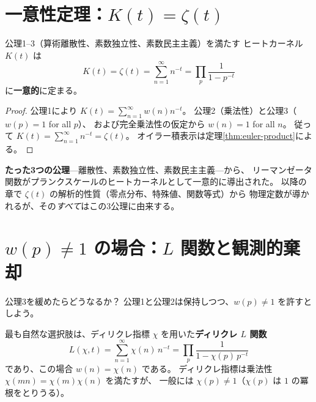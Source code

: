 \section{一意性定理：$K(t) = \zeta(t)$}
\label{sec:uniqueness}

\begin{theorem}[ヒートカーネルの一意性]
\label{thm:uniqueness}
公理1--3（算術離散性、素数独立性、素数民主主義）を満たす
ヒートカーネル $K(t)$ は
\begin{equation}
  K(t) = \zeta(t) = \sum_{n=1}^{\infty} n^{-t} = \prod_{p} \frac{1}{1 - p^{-t}}
  \label{eq:K-equals-zeta}
\end{equation}
に\textbf{一意的}に定まる。
\end{theorem}

\begin{proof}
公理1により $K(t) = \sum_{n=1}^{\infty} w(n) n^{-t}$。
公理2（乗法性）と公理3（$w(p) = 1$ for all $p$）、
および完全乗法性の仮定から $w(n) = 1$ for all $n$。
従って $K(t) = \sum_{n=1}^{\infty} n^{-t} = \zeta(t)$。
オイラー積表示は定理\ref{thm:euler-product}による。
\end{proof}

\begin{keyresult}
\textbf{たった3つの公理}---離散性、素数独立性、素数民主主義---から、
リーマンゼータ関数がプランクスケールのヒートカーネルとして一意的に導出された。
以降の章で $\zeta(t)$ の解析的性質（零点分布、特殊値、関数等式）から
物理定数が導かれるが、その\emph{すべて}はこの3公理に由来する。
\end{keyresult}


\section{$w(p) \ne 1$ の場合：$L$ 関数と観測的棄却}
\label{sec:L-functions}

公理3を緩めたらどうなるか？
公理1と公理2は保持しつつ、$w(p) \ne 1$ を許すとしよう。

最も自然な選択肢は、ディリクレ指標 $\chi$ を用いた\textbf{ディリクレ $L$ 関数}
\begin{equation}
  L(\chi, t) = \sum_{n=1}^{\infty} \chi(n)\, n^{-t}
             = \prod_{p} \frac{1}{1 - \chi(p)\, p^{-t}}
\end{equation}
であり、この場合 $w(n) = \chi(n)$ である。
ディリクレ指標は乗法性 $\chi(mn) = \chi(m)\chi(n)$ を満たすが、
一般には $\chi(p) \ne 1$（$\chi(p)$ は $1$ の冪根をとりうる）。

